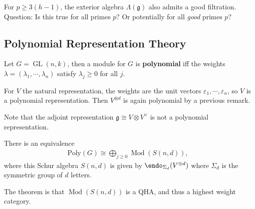 \begin{remark}

For \(p\geq 3(h-1)\), the exterior algebra \(\Lambda({\mathfrak{g}})\)
also admits a good filtration. Question: Is this true for all primes
\(p\)? Or potentially for all \emph{good} primes \(p\)?

\end{remark}

\hypertarget{polynomial-representation-theory}{%
\subsection{Polynomial Representation
Theory}\label{polynomial-representation-theory}}

Let \(G = \operatorname{GL}(n, k)\), then a module for \(G\) is
\textbf{polynomial} iff the weights
\(\lambda = (\lambda_1, \cdots, \lambda_n)\) satisfy
\(\lambda_j \geq 0\) for all \(j\).

\begin{example}

For \(V\) the natural representation, the weights are the unit vectors
\(\varepsilon_1, \cdots, \varepsilon_n\), so \(V\) is a polynomial
representation. Then \(V^{\otimes d}\) is again polynomial by a previous
remark.

\end{example}

\begin{remark}

Note that the adjoint representation
\({\mathfrak{g}}\cong V\otimes V^\vee\) is not a polynomial
representation.

\end{remark}

\begin{theorem}[?]

There is an equivalence
\begin{align*}  
\mathrm{Poly}(G) \cong \bigoplus_{j\geq 0} {\operatorname{Mod}}(S(n, d))
,\end{align*}
where this Schur algebra \(S(n, d)\) is given by
\(\endo_{\Sigma_d}(V^{\otimes d})\) where \(\Sigma_d\) is the symmetric
group of \(d\) letters.

The theorem is that \({\operatorname{Mod}}(S(n, d))\) is a QHA, and thus
a highest weight category.

\end{theorem}

